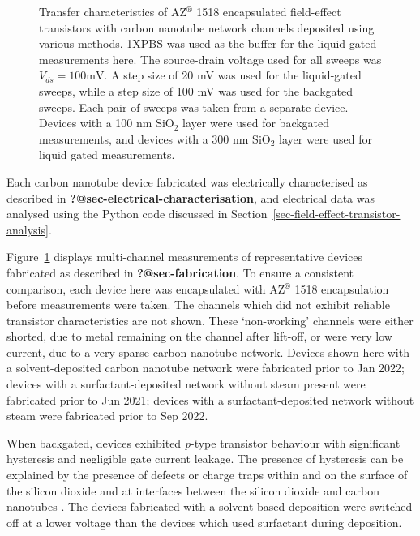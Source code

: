 \documentclass[
  a4paper,
]{scrbook}
\begin{document}
\begin{figure}
\begin{minipage}[t]{0.49\linewidth}
{{}

}

\end{minipage}%

\caption{\label{fig-pristine-cnt-characteristics}Transfer
characteristics of AZ\(^\circledR\) 1518 encapsulated field-effect
transistors with carbon nanotube network channels deposited using
various methods. 1XPBS was used as the buffer for the liquid-gated
measurements here. The source-drain voltage used for all sweeps was
\(V_{ds} = 100 \textrm{mV}\). A step size of 20 mV was used for the
liquid-gated sweeps, while a step size of 100 mV was used for the
backgated sweeps. Each pair of sweeps was taken from a separate device.
Devices with a 100 nm SiO\(_2\) layer were used for backgated
measurements, and devices with a 300 nm SiO\(_2\) layer were used for
liquid gated measurements.}

\end{figure}

Each carbon nanotube device fabricated was electrically characterised as
described in \textbf{?@sec-electrical-characterisation}, and electrical
data was analysed using the Python code discussed in
Section~\ref{sec-field-effect-transistor-analysis}.

Figure~\ref{fig-pristine-cnt-characteristics} displays multi-channel
measurements of representative devices fabricated as described in
\textbf{?@sec-fabrication}. To ensure a consistent comparison, each
device here was encapsulated with AZ\(^\circledR\) 1518 encapsulation
before measurements were taken. The channels which did not exhibit
reliable transistor characteristics are not shown. These `non-working'
channels were either shorted, due to metal remaining on the channel
after lift-off, or were very low current, due to a very sparse carbon
nanotube network. Devices shown here with a solvent-deposited carbon
nanotube network were fabricated prior to Jan 2022; devices with a
surfactant-deposited network without steam present were fabricated prior
to Jun 2021; devices with a surfactant-deposited network without steam
were fabricated prior to Sep 2022.

When backgated, devices exhibited \emph{p}-type transistor behaviour
with significant hysteresis and negligible gate current leakage. The
presence of hysteresis can be explained by the presence of defects or
charge traps within and on the surface of the silicon dioxide and at
interfaces between the silicon dioxide and carbon nanotubes
\autocite{Lee2007,Lee2012,Ha2014}. The devices fabricated with a
solvent-based deposition were switched off at a lower voltage than the
devices which used surfactant during deposition.
\end{document}
